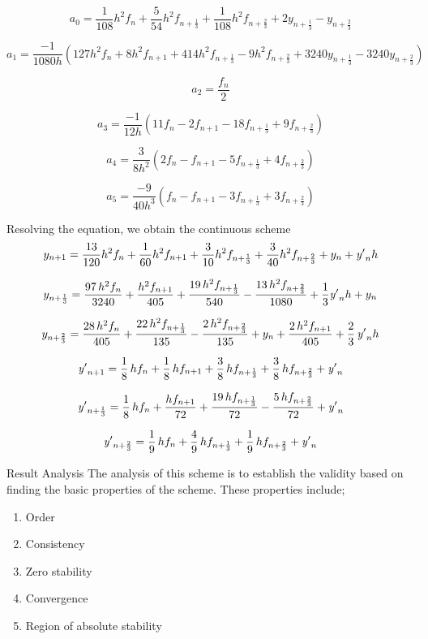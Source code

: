 \documentclass[compress, 19pt, blue]{beamer}
\begin{document}
\begin{frame}
	
	$$a_0=\frac{1}{108}h^2f_n+\frac{5}{54}h^2f_{n+\frac{1}{3}}+\frac{1}{108}h^2f_{n+\frac{2}{3}}+2y_{n+\frac{1}{3}}-y_{n+\frac{2}{3}}$$
	
	$$a_1 = \frac{-1}{1080h}\left(127h^2f_n+8h^2f_{n+1}+414h^2f_{n+\frac{1}{3}}-9h^2f_{n+\frac{2}{3}}+3240y_{n+\frac{1}{3}}-3240y_{n+\frac{2}{3}}\right)$$
	
	$$a_2 = \frac{f_n}{2}$$
	
	$$a_3 = \frac{-1}{12h}\left(11f_n-2f_{n+1}-18f_{n+\frac{1}{3}}+9f_{n+\frac{2}{3}}\right)$$
	
	$$a_4 = \frac{3}{8h^2}\left(2f_n-f_{n+1}-5f_{n+\frac{1}{3}}+4f_{n+\frac{2}{3}}\right)$$
	
	
	$$a_5 = \frac{-9}{40h^3}\left(f_n-f_{n+1}-3f_{n+\frac{1}{3}}+3f_{n+\frac{2}{3}}\right)$$
\end{frame}

\begin{frame}
	\noindent Resolving the equation, we obtain the continuous scheme
	$$y_{{n+1}}=\frac {13}{120}{h}^{2}f_{{n}}+\frac{1}{60} {{h}^{2}f_{{n+1}}}+\frac{3}{10}h^{2}f_{{n+\frac{1}{3}}}+\frac{3}{40}h^2f_{{n+\frac{2}{3}}}+y_{{
			n}}+{\it y'}_{{n}}h$$
	
	$$y_{{n+\frac{1}{3}}}={\frac{97\,{h}^{2}f_{{n}}}{3240}}+{\frac{{h}^{2}f_{{n+1}}}{405}}+{\frac{19\,{h}^{2}f_{{n+\frac{1}{3}}}}{540}}-{\frac{13\,{h}^{2}f_{{n+\frac{2}{3}}}}{1080}}+\frac{1}{3}{\it y'}_{{n}}h+y_{{n}}$$
	
	$$y_{{n+\frac{2}{3}}}={\frac{28\,{h}^{2}f_{{n}}}{405}}+{\frac{22\,{h}^{2}f_{{n+\frac{1}{3}}}}{135}}-{\frac{2\,{h}^{2}f_{{n+\frac{2}{3}}}}{135}}+y_{{n}}+{\frac{2\,{h}^{2}f_{{n+1}}}{405}}+\frac{2}{3}\,{\it y'}_{{n}}h$$
	
	$${\it y'}_{{n+1}}=\frac{1}{8}\,hf_{{n}}+\frac{1}{8}\,hf_{{n+1}}+\frac{3}{8}\,hf_{{n+\frac{1}{3}}}+\frac{3}{8}\,hf_{{n+\frac{2}{3}}}+{\it y'}_{{n}}$$
	
	$${\it y'}_{{n+\frac{1}{3}}}=\frac{1}{8}\,hf_{{n}}+{\frac{hf_{{n+1}}}{72}}+{\frac{19\,hf_{{n+\frac{1}{3}}}}{72}}-{\frac {5\,hf_{{n+\frac{2}{3}}}}{72}}+{\it y'}_{{n}}$$
	
	$${\it y'}_{{n+\frac{2}{3}}}=\frac{1}{9}\,hf_{{n}}+\frac{4}{9}\,hf_{{n+\frac{1}{3}}}+\frac{1}{9}\,hf_{{n+\frac{2}{3}}}+{\it y'}_{{n}}$$
\end{frame}


\begin{frame}{Result Analysis}
	\noindent The analysis of this scheme is to establish the validity based on finding the basic properties of the scheme. These properties include;
	\begin{enumerate}
		\item Order
		\item Consistency
		\item Zero stability
		\item Convergence
		\item Region of absolute stability
	\end{enumerate}
	
\end{frame}
\end{document}
